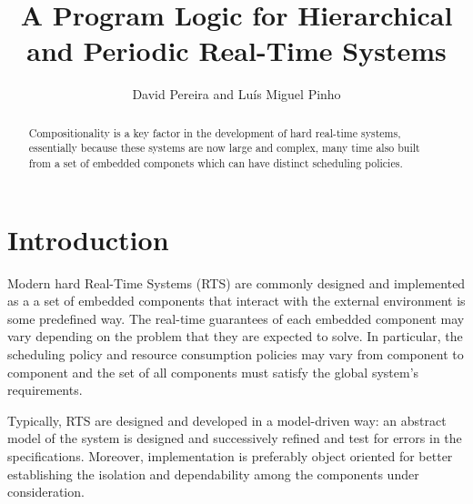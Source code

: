 \documentclass{llncs}
\author{David Pereira and Luís Miguel Pinho}
\title{A Program Logic for Hierarchical and Periodic Real-Time Systems}
\begin{document}
\maketitle

\begin{abstract}
Compositionality is a key factor in the development of hard real-time systems, essentially because these systems are now large and complex, many time also built from a set of embedded componets which can have distinct scheduling policies. 
\end{abstract}

\section{Introduction}

Modern hard Real-Time Systems (RTS) are commonly designed and implemented as a a set of embedded components that interact with the external environment is some predefined way. The real-time guarantees of each embedded component may vary depending on the problem that they are expected to solve. In particular, the scheduling policy and resource consumption policies may vary from component to component and the set of all components must satisfy the global system's requirements.

Typically, RTS are designed and developed in a model-driven way: an abstract model of the system is designed and successively refined and test for errors in the specifications. Moreover, implementation is preferably object oriented for better establishing the isolation and dependability among the components under consideration.




\end{document}
